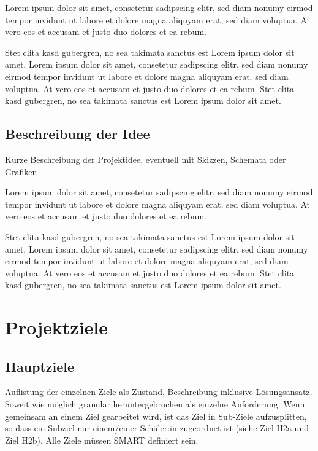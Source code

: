 \documentclass[
	headings=optiontotocandhead,%
	oneside,
	numbers=noenddot,%
	toc=flat, %
	10pt, %
	parskip=full, %
	listof=totoc, %
	listof=flat, %
	numbers=noenddot, %
	bibliography=totoc, %
	a4paper,DIV=14,
]{scrartcl}
\begin{document}
Lorem ipsum dolor sit amet, consetetur sadipscing elitr, sed diam nonumy eirmod tempor invidunt ut labore et dolore magna aliquyam erat, sed diam voluptua. At vero eos et accusam et justo duo dolores et ea rebum. 

Stet clita kasd gubergren, no sea takimata sanctus est Lorem ipsum dolor sit amet. Lorem ipsum dolor sit amet, consetetur sadipscing elitr, sed diam nonumy eirmod tempor invidunt ut labore et dolore magna aliquyam erat, sed diam voluptua. At vero eos et accusam et justo duo dolores et ea rebum. Stet clita kasd gubergren, no sea takimata sanctus est Lorem ipsum dolor sit amet.

\subsection{Beschreibung der Idee}
Kurze Beschreibung der Projektidee, eventuell mit Skizzen, Schemata oder Grafiken

Lorem ipsum dolor sit amet, consetetur sadipscing elitr, sed diam nonumy eirmod tempor invidunt ut labore et dolore magna aliquyam erat, sed diam voluptua. At vero eos et accusam et justo duo dolores et ea rebum. 

Stet clita kasd gubergren, no sea takimata sanctus est Lorem ipsum dolor sit amet. Lorem ipsum dolor sit amet, consetetur sadipscing elitr, sed diam nonumy eirmod tempor invidunt ut labore et dolore magna aliquyam erat, sed diam voluptua. At vero eos et accusam et justo duo dolores et ea rebum. Stet clita kasd gubergren, no sea takimata sanctus est Lorem ipsum dolor sit amet.

\newpage

\newpage
\section{Projektziele}
\subsection{Hauptziele}
Auflistung der einzelnen Ziele als Zustand, Beschreibung inklusive Lösungsansatz. Soweit wie möglich granular heruntergebrochen als einzelne Anforderung. Wenn gemeinsam an einem Ziel gearbeitet wird, ist das Ziel in Sub-Ziele aufzusplitten, so dass ein Subziel nur einem/einer Schüler:in zugeordnet ist (siehe Ziel H2a und Ziel H2b). Alle Ziele müssen SMART definiert sein.
 
\end{document}
